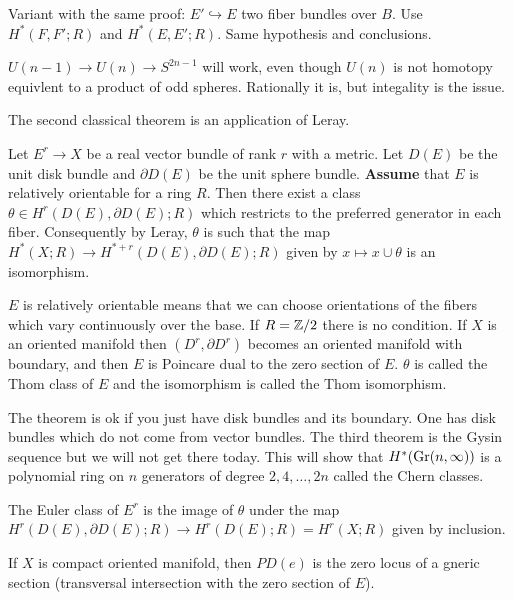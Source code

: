 \documentclass[12pt]{article}
\begin{document}
Variant with the same proof: $E' \hookrightarrow E$ two fiber bundles over $B$. Use $H^*(F,F';R)$ and $H^*(E,E';R)$. Same hypothesis and conclusions.

\begin{example}
    $U(n-1) \to U(n) \to S^{2n-1}$ will work, even though $U(n)$ is not homotopy equivlent to a product of odd spheres. Rationally it is, but integality is the issue.
\end{example}

The second classical theorem is an application of Leray.
\begin{theorem}
     Let $E^r \to X$ be a real vector bundle of rank $r$ with a metric. Let $D(E)$ be the unit disk bundle and $\partial D(E)$ be the unit sphere bundle. \textbf{Assume} that $E$ is relatively orientable for a ring $R$. Then there exist a class $\theta\in H^r(D(E), \partial D(E); R)$ 
    which restricts to the preferred generator in each fiber. Consequently by Leray, $\theta$ is such that the map $H^*(X;R) \to H^{*+r}(D(E), \partial D(E); R)$ given by $x \mapsto x\cup\theta$ is an isomorphism.
\end{theorem}
$E$ is relatively orientable means that we can choose orientations of the fibers which vary continuously over the base.
If $R = \mathbb{Z}/2$ there is no condition. If $X$ is an oriented manifold then $(D^r,\partial D^r)$ becomes an oriented manifold with boundary, and then $E$ is Poincare dual to the zero section of $E$. $\theta$ is called the Thom class of $E$ and the isomorphism is called the Thom isomorphism.

The theorem is ok if you just have disk bundles and its boundary. One has disk bundles which do not come from vector bundles. The third theorem is the Gysin sequence but we will not get there today. This will show that $H^*(\operatorname{Gr}(n,\infty))$ is a polynomial ring on $n$ generators of degree $2,4,\dots, 2n$ called the Chern classes.


\begin{definition}
    The Euler class of $E^r$ is the image of $\theta$ under the map $H^r(D(E), \partial D(E); R) \to H^r(D(E); R) = H^r(X; R)$ given by inclusion. 
\end{definition}

If $X$ is compact oriented manifold, then $PD(e)$ is the zero locus of a gneric section (transversal intersection with the zero section of $E$).
\end{document}
